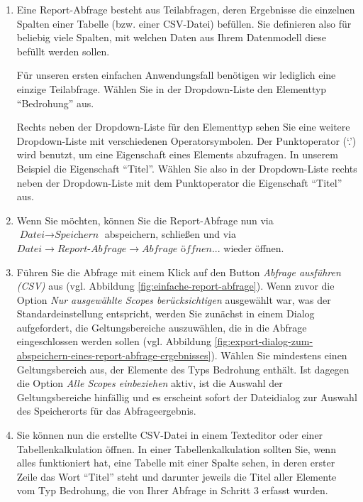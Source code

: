 \documentclass[a4paper,10pt]{book}
\providecommand{\tightlist}{%
  \setlength{\itemsep}{0pt}\setlength{\parskip}{0pt}}
\begin{document}
\begin{enumerate}
\def\labelenumi{\arabic{enumi}.}
\setcounter{enumi}{1}
\tightlist
\item
  Eine Report-Abfrage besteht aus Teilabfragen, deren Ergebnisse die einzelnen
  Spalten einer Tabelle (bzw. einer CSV-Datei) befüllen. Sie definieren also für
  beliebig viele Spalten, mit welchen Daten aus Ihrem Datenmodell diese befüllt
  werden sollen.

  Für unseren ersten einfachen Anwendungsfall benötigen wir lediglich eine
  einzige Teilabfrage. Wählen Sie in der Dropdown-Liste den Elementtyp
  ``Bedrohung'' aus.

  Rechts neben der Dropdown-Liste für den Elementtyp sehen Sie eine weitere
  Dropdown-Liste mit verschiedenen Operatorsymbolen. Der Punktoperator (`.')
  wird benutzt, um eine Eigenschaft eines Elements abzufragen. In unserem
  Beispiel die Eigenschaft ``Titel''. Wählen Sie also in der Dropdown-Liste
  rechts neben der Dropdown-Liste mit dem Punktoperator die Eigenschaft
  ``Titel'' aus.

\item Wenn Sie möchten, können Sie die Report-Abfrage nun via
$\textit{Datei}\to\textit{Speichern}$ abspeichern, schließen und via
$\textit{Datei}\to\textit{Report-Abfrage}\to\textit{Abfrage öffnen...}$ wieder
öffnen.

\item
  Führen Sie die Abfrage mit einem Klick auf den Button \emph{Abfrage ausführen
  (CSV)} aus (vgl. Abbildung \ref{fig:einfache-report-abfrage}). Wenn zuvor die
  Option \emph{Nur ausgewählte Scopes berücksichtigen} ausgewählt war, was der
  Standardeinstellung entspricht, werden Sie zunächst in einem Dialog
  aufgefordert, die Geltungsbereiche auszuwählen, die in die Abfrage
  eingeschlossen werden sollen (vgl. Abbildung
  \ref{fig:export-dialog-zum-abspeichern-eines-report-abfrage-ergebnisses}).
  Wählen Sie mindestens einen Geltungsbereich aus, der Elemente des Typs
  Bedrohung enthält. Ist dagegen die Option \emph{Alle Scopes einbeziehen}
  aktiv, ist die Auswahl der Geltungsbereiche hinfällig und es erscheint sofort
  der Dateidialog zur Auswahl des Speicherorts für das Abfrageergebnis.

\item
  Sie können nun die erstellte CSV-Datei in einem Texteditor oder einer
  Tabellenkalkulation öffnen. In einer Tabellenkalkulation sollten Sie, wenn
  alles funktioniert hat, eine Tabelle mit einer Spalte sehen, in deren erster
  Zeile das Wort ``Titel'' steht und darunter jeweils die Titel aller Elemente
  vom Typ Bedrohung, die von Ihrer Abfrage in Schritt 3 erfasst wurden.
\end{enumerate}
\end{document}
